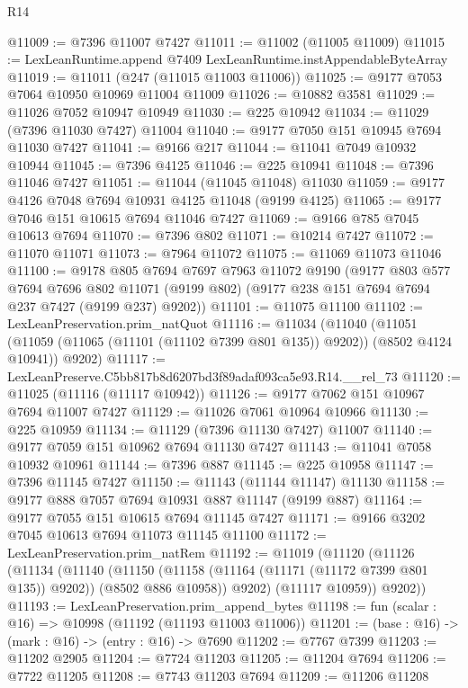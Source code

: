 \begin{lexlean}{R14}
\begin{coremodule}
@11009 := @7396 @11007 @7427
@11011 := @11002 (@11005 @11009)
@11015 := LexLeanRuntime.append @7409 LexLeanRuntime.instAppendableByteArray
@11019 := @11011 (@247 (@11015 @11003 @11006))
@11025 := @9177 @7053 @7064 @10950 @10969 @11004 @11009
@11026 := @10882 @3581
@11029 := @11026 @7052 @10947 @10949
@11030 := @225 @10942
@11034 := @11029 (@7396 @11030 @7427) @11004
@11040 := @9177 @7050 @151 @10945 @7694 @11030 @7427
@11041 := @9166 @217
@11044 := @11041 @7049 @10932 @10944
@11045 := @7396 @4125
@11046 := @225 @10941
@11048 := @7396 @11046 @7427
@11051 := @11044 (@11045 @11048) @11030
@11059 := @9177 @4126 @7048 @7694 @10931 @4125 @11048 (@9199 @4125)
@11065 := @9177 @7046 @151 @10615 @7694 @11046 @7427
@11069 := @9166 @785 @7045 @10613 @7694
@11070 := @7396 @802
@11071 := @10214 @7427
@11072 := @11070 @11071
@11073 := @7964 @11072
@11075 := @11069 @11073 @11046
@11100 := @9178
    @805
    @7694
    @7697
    @7963
    @11072
    @9190
    (@9177
      @803
      @577
      @7694
      @7696
      @802
      @11071
      (@9199 @802)
      (@9177 @238 @151 @7694 @7694 @237 @7427 (@9199 @237) @9202))
@11101 := @11075 @11100
@11102 := LexLeanPreservation.prim_natQuot
@11116 := @11034
    (@11040
      (@11051 (@11059 (@11065 (@11101 (@11102 @7399 @801 @135)) @9202)) (@8502 @4124 @10941))
      @9202)
@11117 := LexLeanPreserve.C5bb817b8d6207bd3f89adaf093ca5e93.R14.__rel_73
@11120 := @11025 (@11116 (@11117 @10942))
@11126 := @9177 @7062 @151 @10967 @7694 @11007 @7427
@11129 := @11026 @7061 @10964 @10966
@11130 := @225 @10959
@11134 := @11129 (@7396 @11130 @7427) @11007
@11140 := @9177 @7059 @151 @10962 @7694 @11130 @7427
@11143 := @11041 @7058 @10932 @10961
@11144 := @7396 @887
@11145 := @225 @10958
@11147 := @7396 @11145 @7427
@11150 := @11143 (@11144 @11147) @11130
@11158 := @9177 @888 @7057 @7694 @10931 @887 @11147 (@9199 @887)
@11164 := @9177 @7055 @151 @10615 @7694 @11145 @7427
@11171 := @9166 @3202 @7045 @10613 @7694 @11073 @11145 @11100
@11172 := LexLeanPreservation.prim_natRem
@11192 := @11019
    (@11120
      (@11126
        (@11134
          (@11140
            (@11150 (@11158 (@11164 (@11171 (@11172 @7399 @801 @135)) @9202)) (@8502 @886 @10958))
            @9202)
          (@11117 @10959))
        @9202))
@11193 := LexLeanPreservation.prim_append_bytes
@11198 := fun (scalar : @16) => @10998 (@11192 (@11193 @11003 @11006))
@11201 := (base : @16) -> (mark : @16) -> (entry : @16) -> @7690
@11202 := @7767 @7399
@11203 := @11202 @2905
@11204 := @7724 @11203
@11205 := @11204 @7694
@11206 := @7722 @11205
@11208 := @7743 @11203 @7694
@11209 := @11206 @11208

\end{coremodule}
\end{lexlean}
